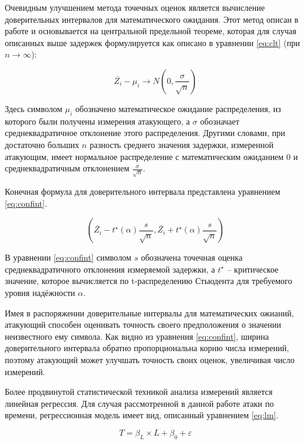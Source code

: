 Очевидным улучшением метода точечных оценок является вычисление доверительных
интервалов для математического ожидания. Этот метод описан в работе
\cite{confint} и основывается на центральной предельной теореме, которая для
случая описанных выше задержек формулируется как описано в уравнении \ref{eq:clt} (при $n \to \infty$):

\nopagebreak

\begin{equation} \label{eq:clt}
\bar{Z_i} - \mu_i \to N(0, \frac{\sigma}{\sqrt{n}})
\end{equation}

Здесь символом $\mu_i$ обозначено математическое ожидание распределения,
из которого были получены измерения атакующего, а $\sigma$ обозначает
среднеквадратичное отклонение этого распределения. Другими словами, при
достаточно больших $n$ разность среднего значения задержки, измеренной
атакующим, имеет нормальное распределение с математическим ожиданием $0$ и
среднеквадратичным отклонением $\frac{\sigma}{\sqrt{n}}$.

Конечная формула для доверительного интервала представлена уравнением
\ref{eq:confint}.

\nopagebreak

\begin{equation} \label{eq:confint}
(\bar{Z_i} - t^{\star}(\alpha) \frac{s}{\sqrt{n}}, \bar{Z_i} + t^{\star}(\alpha) \frac{s}{\sqrt{n}})
\end{equation}

В уравнении \ref{eq:confint} символом $s$ обозначена точечная оценка среднеквадратичного отклонения
измеряемой задержки, а $t^{\star}$ -- критическое значение, которое вычисляется
по t-распределению Стьюдента для требуемого уровня надёжности $\alpha$.

Имея в распоряжении доверительные интервалы для математических ожианий,
атакующий способен оценивать точность своего предположения о значении
неизвестного ему символа. Как видно из уравнения \ref{eq:confint}, ширина
доверительного интервала обратно пропорциональна корню числа измерений,
поэтому атакующий может улучшать точность своих оценок, увеличивая число
измерений.

Более продвинутой статистической техникой анализа измерений является линейная регрессия.
Для случая рассмотренной в данной работе атаки по времени, регрессионная модель имеет вид,
описанный уравнением \ref{eq:lm}.

\nopagebreak

\begin{equation} \label{eq:lm}
T = \beta_L \times L + \beta_0 + \varepsilon
\end{equation}

